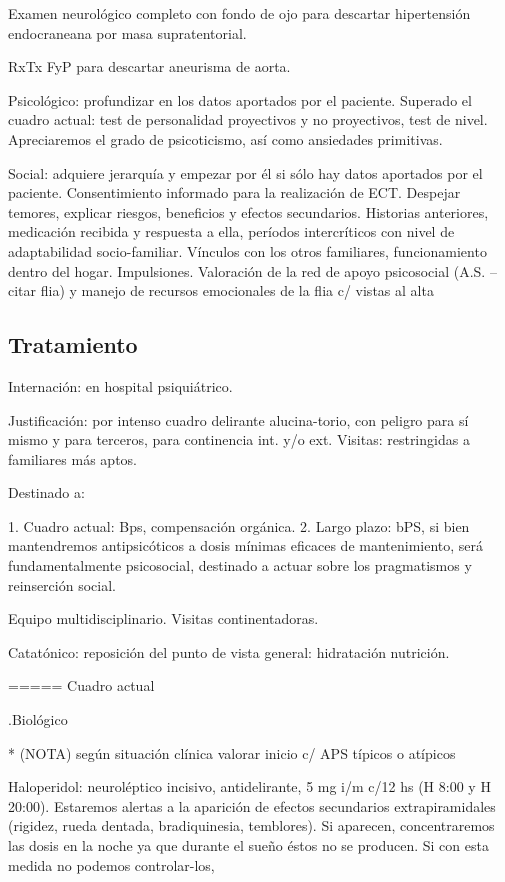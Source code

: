 Examen neurológico completo con fondo de ojo para descartar hipertensión endocraneana por masa supratentorial.

RxTx FyP para descartar aneurisma de aorta.

Psicológico: profundizar en los datos aportados por el paciente. Superado el cuadro actual: test de personalidad proyectivos y no proyectivos, test de nivel. Apreciaremos el grado de psicoticismo, así como ansiedades primitivas.

Social: adquiere jerarquía y empezar por él si sólo hay datos aportados por el paciente. Consentimiento informado para la realización de ECT. Despejar temores, explicar riesgos, beneficios y efectos secundarios. Historias anteriores, medicación recibida y respuesta a ella, períodos intercríticos con nivel de adaptabilidad socio-familiar. Vínculos con los otros familiares, funcionamiento dentro del hogar. Impulsiones. Valoración de la red de apoyo psicosocial (A.S. – citar flia) y manejo de recursos emocionales de la flia c/ vistas al alta
\subsection*{Tratamiento}
Internación: en hospital psiquiátrico.

Justificación: por intenso cuadro delirante alucina-torio, con peligro para sí mismo y para terceros, para continencia int. y/o ext. Visitas: restringidas a familiares más aptos.

Destinado a:

1. Cuadro actual: Bps, compensación orgánica.
2. Largo plazo: bPS, si bien mantendremos antipsicóticos a dosis mínimas eficaces de mantenimiento, será fundamentalmente psicosocial, destinado a actuar sobre los pragmatismos y reinserción social.

Equipo multidisciplinario. Visitas continentadoras.

Catatónico: reposición del punto de vista general: hidratación nutrición.

===== Cuadro actual

.Biológico

* (NOTA) según situación clínica valorar inicio c/ APS típicos o atípicos

Haloperidol: neuroléptico incisivo, antidelirante, 5 mg i/m c/12 hs (H 8:00 y H 20:00). Estaremos alertas a la aparición de efectos secundarios extrapiramidales (rigidez, rueda dentada, bradiquinesia, temblores). Si aparecen, concentraremos las dosis en la noche ya que durante el sueño éstos no se producen. Si con esta medida no podemos controlar-los,

